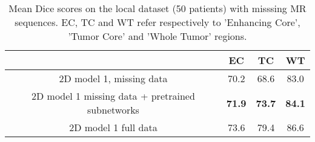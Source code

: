 \documentclass[preprint,12pt]{elsarticle}
\begin{document}
\begin{table}[ht!]
\centering
\caption{Mean Dice scores on the local dataset (50 patients) with misssing MR sequences. EC, TC and WT refer respectively to 'Enhancing Core', 'Tumor Core' and 'Whole Tumor' regions.}
\begin{tabular}{|c|c|c|c|}
  \hline
& \scriptsize{EC }& \scriptsize{TC}& \scriptsize{WT}\\  
\hline
\scriptsize{  2D model 1, missing data}& \scriptsize{  70.2 }& \scriptsize{  68.6}& \scriptsize{ 83.0  }\\ 
  \hline
\scriptsize{ 2D model 1 missing data + pretrained subnetworks}& \scriptsize{ \textbf{71.9} }& \scriptsize{ \textbf{73.7}  }& \scriptsize{ \textbf{84.1}  }\\ 
    \hline
\scriptsize{  2D model 1 full data}& \scriptsize{  73.6 }& \scriptsize{ 79.4}& \scriptsize{ 86.6  }\\ 
  \hline
\end{tabular}
\label{table_results_subnetworks}
\end{table}
\end{document}
